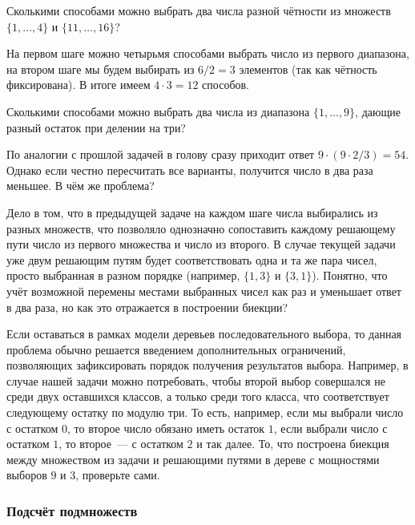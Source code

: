 \begin{Exercise}[counter=SecExercise]
    \noindent
    Сколькими способами можно выбрать два числа разной чётности из множеств $ \{1, \ldots, 4\} $ и $ \{ 11, \ldots, 16 \} $?
\end{Exercise}

\begin{Answer}
    \noindent
    На первом шаге можно четырьмя способами выбрать число из первого диапазона,
    на втором шаге мы будем выбирать из $ 6 / 2 = 3 $ элементов (так как чётность фиксирована).
    В итоге имеем $ 4 \cdot 3 = 12 $ способов.
\end{Answer}

\begin{Exercise}[counter=SecExercise]
    \noindent
    Сколькими способами можно выбрать два числа из диапазона $ \{ 1, \ldots, 9 \} $, дающие разный остаток при делении на три?
\end{Exercise}

По аналогии с прошлой задачей в голову сразу приходит ответ $ 9 \cdot (9 \cdot 2 / 3) = 54 $.
Однако если честно пересчитать все варианты, получится число в два раза меньшее.
В чём же проблема?

Дело в том, что в предыдущей задаче на каждом шаге числа выбирались из разных множеств,
что позволяло однозначно сопоставить каждому решающему пути число из первого множества и число из второго.
В случае текущей задачи уже двум решающим путям будет соответствовать одна и та же пара чисел, просто выбранная в разном порядке (например, $ \{1, 3\} $ и $ \{3, 1\} $).
Понятно, что учёт возможной перемены местами выбранных чисел как раз и уменьшает ответ в два раза, но как это отражается в построении биекции?

Если оставаться в рамках модели деревьев последовательного выбора, то данная проблема обычно решается введением дополнительных ограничений,
позволяющих зафиксировать порядок получения результатов выбора.
Например, в случае нашей задачи можно потребовать, чтобы второй выбор совершался не среди двух оставшихся классов,
а только среди того класса, что соответствует следующему остатку по модулю три.
То есть, например, если мы выбрали число с остатком $ 0 $, то второе число обязано иметь остаток $ 1 $,
если выбрали число с остатком $ 1 $, то второе~--- с остатком $ 2 $ и так далее.
То, что построена биекция между множеством из задачи и решающими путями в дереве с мощностями выборов $ 9 $ и $ 3 $, проверьте сами.

\subsubsection{Подсчёт подмножеств}

